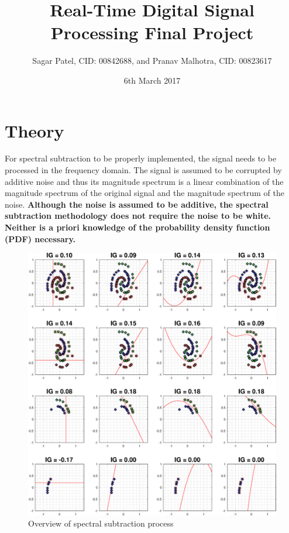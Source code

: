 \documentclass[a4paper,pra,twocolumn,10pt,aps,longbibliography,nobalancelastpage]{revtex4-1}
\begin{document}
\title{Real-Time Digital Signal Processing Final Project}
\author{Sagar Patel, CID: 00842688, and Pranav Malhotra, CID: 00823617}
\date{6th March 2017}

\maketitle
\section{Theory}\label{sec:theory} 
For spectral subtraction to be properly implemented, the signal needs to be processed in the frequency domain. The signal is assumed to be corrupted by additive noise and thus its magnitude spectrum is a linear combination of the magnitude spectrum of the original signal and the magnitude spectrum of the noise. \textbf{Although the noise is assumed to be additive, the spectral subtraction methodology does not require the noise to be white. Neither is a priori knowledge of the probability density function (PDF) necessary.}

\begin{figure}[H]
    \includegraphics[width=\columnwidth]{split_function_visualitions}
    \caption{Overview of spectral subtraction process}
    \label{fig:spec_sub_overview}
\end{figure}
\end{document}
